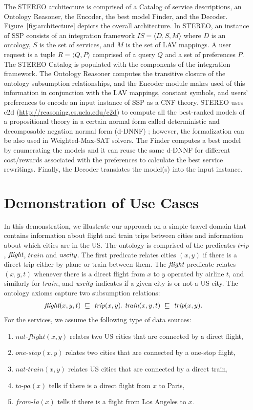 \documentclass{llncs}
\newcommand{\tup}[1]{\langle #1 \rangle}
\newcommand{\orule}{\sqsubseteq}
\newcommand{\flight}{\text{\it flight}}
\newcommand{\UScity}{\text{\it uscity}}
\newcommand{\trip}{\textit{trip}}
\newcommand{\train}{\textit{train}}
\newcommand{\nationaltlight}{\textit{nat-flight}}
\newcommand{\nationaltrain}{\textit{nat-train}}
\newcommand{\onestop}{\textit{one-stop}}
\newcommand{\toPA}{\textit{to-pa}}
\newcommand{\fromLA}{\textit{from-la}}
\begin{document}
 The STEREO architecture  is comprised of a Catalog of service descriptions,
 an Ontology Reasoner, the Encoder, the best model Finder,
and the Decoder.
Figure~\ref{fig:architecture} depicts the overall architecture. In STEREO, an instance of SSP consists of an integration framework $IS=\tup{D,S,M}$ where $D$ is an ontology, $S$ is the set
of services, and $M$ is the set of LAV mappings. A user request is a tuple $R=\tup{Q,P}$ comprised of a query $Q$  and a set of preferences $P$. The STEREO Catalog is populated with the components of the integration framework. The Ontology Reasoner computes the transitive
closure of the ontology subsumption relationships, and the Encoder module makes used of this information in conjunction with the LAV mappings,  constant symbols,   and users' preferences to encode  an input instance of SSP as a CNF theory.
STEREO uses  c2d (\url{http://reasoning.cs.ucla.edu/c2d}) to compute all the
best-ranked models of a propositional theory  in a certain 
normal form called deterministic and decomposable negation normal
form (d-DNNF) \cite{darwiche:d-dnnfs}; however, the formalization can be also used in Weighted-Max-SAT solvers.
 The Finder computes a best model by enumerating the models  and it can reuse the same d-DNNF for different cost/rewards associated with the preferences to calculate  the best service rewritings. 
   Finally, the Decoder translates the model(s)  into the input instance.


\section{Demonstration of Use Cases}
In this demonstration, we illustrate our approach on  a simple travel domain that contains information about
flight and train trips between cities and information about which cities
are in the US. The ontology is comprised of the predicates
$\trip$, $\flight$, $\train$ and $\UScity$.
The first predicate relates cities $(x,y)$ if there is a direct
trip either by plane or train between them. The $\flight$ predicate relates $(x,y,t)$ whenever there is a direct flight from $x$ to $y$ operated by airline $t$, and similarly for $\train$,
and $\UScity$ indicates if a given city is or not a US city. 
The ontology axioms capture two subsumption relations:
\begin{alignat*}{1}
\flight(x,y,t)\  \orule\ \trip(x,y).\  & \train(x,y,t)\  \orule\ \trip(x,y).
\end{alignat*}
For the services, we assume the following type of data sources:
\begin{enumerate}[--]
\item $\nationaltlight(x,y)$ relates two US cities that are connected by a direct flight,
\item $\onestop(x,y)$ relates two cities that are connected by a one-stop flight,
\item $\nationaltrain(x,y)$ relates US cities that are connected by a direct train,
\item $\toPA(x)$ tells if there is a direct flight from $x$ to Paris,
\item $\fromLA(x)$ tells if there is a flight from Los Angeles to $x$.
\end{enumerate}
\end{document}
